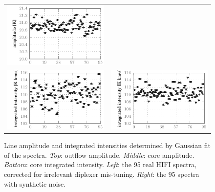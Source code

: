 \begin{figure}[bp]
\begin{tabular}{@{}c@{}c@{}}
        \includegraphics{spread_87_core_ampl_noisy}    \\
        \includegraphics{spread_87_core_iint_corrected}&
        \includegraphics{spread_87_core_iint_noisy}    \\
        \bottomrule
    \end{tabular}
    \caption{
        Line amplitude and integrated intensities determined by Gaussian fit of the
         spectra.
        \emph{Top}: outflow amplitude.
        \emph{Middle}: core amplitude.
        \emph{Bottom}: core integrated intensity.
        \emph{Left}:  the 95 real HIFI spectra, corrected for irrelevant diplexer mis-tuning.
        \emph{Right}: the 95 spectra with synthetic noise.
    }
    \label{fig:fit_87}
\end{figure}

